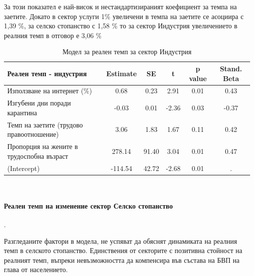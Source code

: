 \documentclass[a4paper,12pt]{article}
\begin{document}
За този показател е най-висок и нестандартизираният коефициент за темпа на заетите. Докато в сектор услуги 1\% увеличени в темпа на заетите се асоциира с 1,39 \%, за селско стопанство с 1,58 \% то за сектор Индустрия увеличението в реалния темп в отговор е 3,06 \%

\begin{table}[ht]
	\centering
	\caption{Модел за реален темп за сектор Индустрия}
	\begin{tabular}{lccccc}
		\toprule
		Реален темп - индустрия & Estimate & SE    & t     & p value & Stand. Beta \\
		\midrule
		Използване на интернет (\%) & 0.68  & 0.23  & 2.91  & 0.01  & 0.43 \\
		Изгубени дни поради карантина  & -0.03 & 0.01  & -2.36 & 0.03  & -0.37 \\
		Темп на заетите (трудово правоотношение) & 3.06  & 1.83  & 1.67  & 0.11  & 0.42 \\
		Пропорция на жените в трудоспобна възраст  & 278.14 & 91.40 & 3.04  & 0.01  & 0.47 \\
		(Intercept) & -114.54 & 42.72 & -2.68 & 0.01  & . \\
		\bottomrule
	\end{tabular}%
	\label{tab:addlabel}%
\end{table}%

\

\paragraph{Реален темп на изменение сектор Селско стопанство}.

Разгледаните фактори в модела, не успяват да обяснят динамиката на реалния темп в селското стопанство. Единствения от секторите с позитивна стойност на реалният темп, въпреки невъзможността да компенсира във състава на БВП на глава от населението. 
\end{document}
